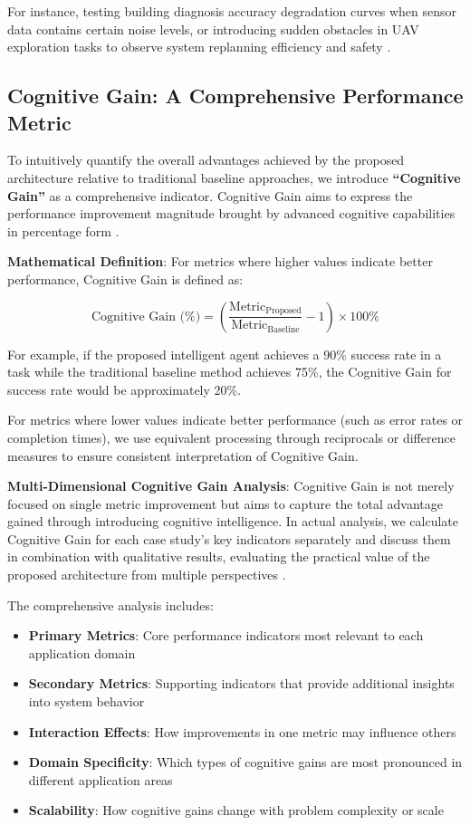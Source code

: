 For instance, testing building diagnosis accuracy degradation curves when sensor data contains certain noise levels, or introducing sudden obstacles in UAV exploration tasks to observe system replanning efficiency and safety \cite{grande2012scan}.

\subsection{Cognitive Gain: A Comprehensive Performance Metric}

To intuitively quantify the overall advantages achieved by the proposed architecture relative to traditional baseline approaches, we introduce \textbf{``Cognitive Gain''} as a comprehensive indicator. Cognitive Gain aims to express the performance improvement magnitude brought by advanced cognitive capabilities in percentage form \cite{stone2016artificial}.

\textbf{Mathematical Definition}: For metrics where higher values indicate better performance, Cognitive Gain is defined as:

\begin{equation}
\text{Cognitive Gain (\%)} = \left(\frac{\text{Metric}_{\text{Proposed}}}{\text{Metric}_{\text{Baseline}}} - 1\right) \times 100\%
\end{equation}

For example, if the proposed intelligent agent achieves a 90\% success rate in a task while the traditional baseline method achieves 75\%, the Cognitive Gain for success rate would be approximately 20\%.

For metrics where lower values indicate better performance (such as error rates or completion times), we use equivalent processing through reciprocals or difference measures to ensure consistent interpretation of Cognitive Gain.

\textbf{Multi-Dimensional Cognitive Gain Analysis}: Cognitive Gain is not merely focused on single metric improvement but aims to capture the total advantage gained through introducing cognitive intelligence. In actual analysis, we calculate Cognitive Gain for each case study's key indicators separately and discuss them in combination with qualitative results, evaluating the practical value of the proposed architecture from multiple perspectives \cite{hernandez2022measuring}.

The comprehensive analysis includes:

\begin{itemize}
\item \textbf{Primary Metrics}: Core performance indicators most relevant to each application domain
\item \textbf{Secondary Metrics}: Supporting indicators that provide additional insights into system behavior
\item \textbf{Interaction Effects}: How improvements in one metric may influence others
\item \textbf{Domain Specificity}: Which types of cognitive gains are most pronounced in different application areas
\item \textbf{Scalability}: How cognitive gains change with problem complexity or scale
\end{itemize}

